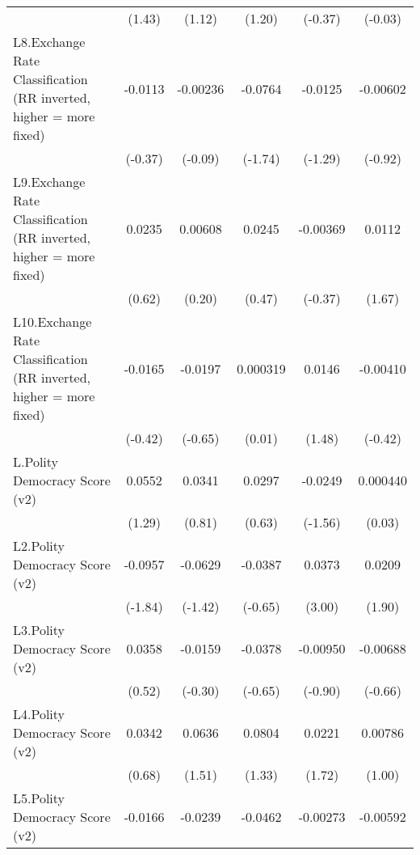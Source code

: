 {\begin{longtable}{l*{5}{c}}
                &   (1.43)         &   (1.12)         &   (1.20)         &  (-0.37)         &  (-0.03)         \\
[1em]
L8.Exchange Rate Classification (RR inverted, higher = more fixed)&  -0.0113         & -0.00236         &  -0.0764         &  -0.0125         & -0.00602         \\
                &  (-0.37)         &  (-0.09)         &  (-1.74)         &  (-1.29)         &  (-0.92)         \\
[1em]
L9.Exchange Rate Classification (RR inverted, higher = more fixed)&   0.0235         &  0.00608         &   0.0245         & -0.00369         &   0.0112         \\
                &   (0.62)         &   (0.20)         &   (0.47)         &  (-0.37)         &   (1.67)         \\
[1em]
L10.Exchange Rate Classification (RR inverted, higher = more fixed)&  -0.0165         &  -0.0197         & 0.000319         &   0.0146         & -0.00410         \\
                &  (-0.42)         &  (-0.65)         &   (0.01)         &   (1.48)         &  (-0.42)         \\
[1em]
L.Polity Democracy Score (v2)&   0.0552         &   0.0341         &   0.0297         &  -0.0249         & 0.000440         \\
                &   (1.29)         &   (0.81)         &   (0.63)         &  (-1.56)         &   (0.03)         \\
[1em]
L2.Polity Democracy Score (v2)&  -0.0957         &  -0.0629         &  -0.0387         &   0.0373\sym{**} &   0.0209         \\
                &  (-1.84)         &  (-1.42)         &  (-0.65)         &   (3.00)         &   (1.90)         \\
[1em]
L3.Polity Democracy Score (v2)&   0.0358         &  -0.0159         &  -0.0378         & -0.00950         & -0.00688         \\
                &   (0.52)         &  (-0.30)         &  (-0.65)         &  (-0.90)         &  (-0.66)         \\
[1em]
L4.Polity Democracy Score (v2)&   0.0342         &   0.0636         &   0.0804         &   0.0221         &  0.00786         \\
                &   (0.68)         &   (1.51)         &   (1.33)         &   (1.72)         &   (1.00)         \\
[1em]
L5.Polity Democracy Score (v2)&  -0.0166         &  -0.0239         &  -0.0462         & -0.00273         & -0.00592         \\

\end{longtable}}
